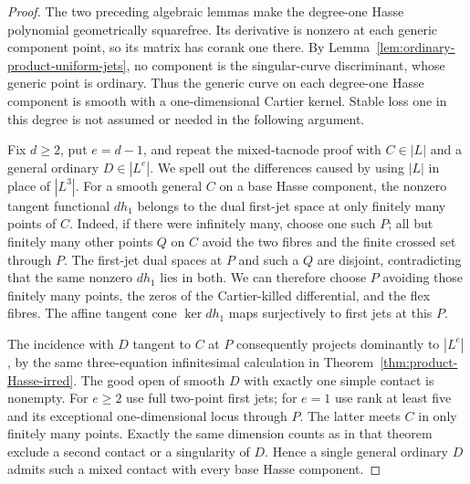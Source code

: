 \begin{proof}
The two preceding algebraic lemmas make the degree-one Hasse
polynomial geometrically squarefree. Its derivative is nonzero
at each generic component point, so its matrix has corank one
there. By Lemma~\ref{lem:ordinary-product-uniform-jets}, no
component is the singular-curve discriminant, whose generic
point is ordinary. Thus the generic curve on each degree-one
Hasse component is smooth with a one-dimensional Cartier
kernel. Stable loss one in this degree is not assumed or
needed in the following argument.

Fix $d\ge2$, put $e=d-1$, and repeat the mixed-tacnode proof
with $C\in|L|$ and a general ordinary $D\in|L^e|$.
We spell out the differences caused by using $|L|$ in place
of $|L^3|$.
For a smooth general $C$ on a base Hasse component, the
nonzero tangent functional $dh_1$ belongs to the dual
first-jet space at only finitely many points of $C$.
Indeed, if there were infinitely many, choose one such $P$;
all but finitely many other points $Q$ on $C$ avoid the two
fibres and the finite crossed set through $P$.
The first-jet dual spaces at $P$ and such a $Q$ are disjoint,
contradicting that the same nonzero $dh_1$ lies in both.
We can therefore choose $P$ avoiding those finitely many
points, the zeros of the Cartier-killed differential, and the
flex fibres. The affine tangent cone $\ker dh_1$ maps
surjectively to first jets at this $P$.

The incidence with $D$ tangent to $C$ at $P$ consequently
projects dominantly to $|L^e|$, by the same three-equation
infinitesimal calculation in
Theorem~\ref{thm:product-Hasse-irred}. The good open of smooth
$D$ with exactly one simple contact is nonempty. For $e\ge2$
use full two-point first jets; for $e=1$ use rank at least five
and its exceptional one-dimensional locus through $P$.
The latter meets $C$ in only finitely many points. Exactly the
same dimension counts as in that theorem exclude a second
contact or a singularity of $D$.
Hence a single general ordinary $D$ admits such a mixed
contact with every base Hasse component.


\end{proof}
